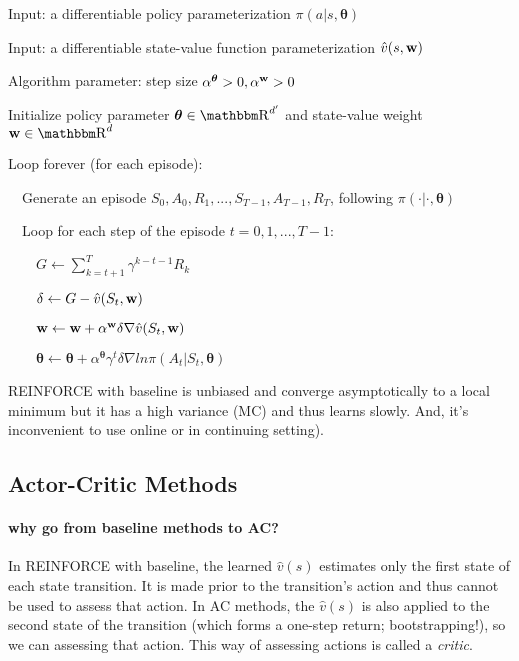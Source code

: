 \documentclass[sutton_barto_notes.tex]{subfiles}
\begin{document}
\begin{tcolorbox}[width=1.1\textwidth,title={REINFORCE with baseline (episodic) for estimating $\pi_*$}]
Input: a differentiable policy parameterization $\pi(a|s,\bm{\theta})$

Input: a differentiable state-value function parameterization $\hat{v}(s,{\operatorname*{\mathbf{w}}})$

Algorithm parameter: step size $\alpha^{\bm{\theta}} > 0, \alpha^{{\operatorname*{\mathbf{w}}}} > 0$

Initialize policy parameter $\bm{\theta} \in \R^{d'}$ and state-value weight ${\bw} \in \R^d$

Loop forever (for each episode):

$\quad$Generate an episode $S_0,A_0,R_1,...,S_{T-1},A_{T-1},R_T$, following $\pi(\cdot|\cdot,\bm{\theta})$

$\quad$Loop for each step of the episode $t=0,1,...,T-1$:

$\quad\quad G\leftarrow\sum_{k=t+1}^T \gamma^{k-t-1}R_k$

$\quad\quad \delta\leftarrow G - \hat{v}(S_t, {\operatorname*{\mathbf{w}}})$

$\quad\quad {\operatorname*{\mathbf{w}}} \leftarrow {\operatorname*{\mathbf{w}}} + \alpha^{{\operatorname*{\mathbf{w}}}}\delta\nabla\hat{v}(S_t,{\operatorname*{\mathbf{w}}})$

$\quad\quad\bm{\theta}\leftarrow\bm{\theta}+\alpha^{\bm{\theta}}\gamma^t \delta \nabla ln\pi(A_t | S_t, \bm{\theta})$
\end{tcolorbox}

REINFORCE with baseline is unbiased and converge asymptotically to a local minimum but it has a high variance (MC) and thus learns slowly.
And, it’s inconvenient to use online or in continuing setting).


\subsection{Actor-Critic Methods}

\paragraph{why go from baseline methods to AC?} In REINFORCE with baseline, the learned $\hat{v}(s)$ estimates only the first state of each state transition. It is made prior to the transition's action and thus cannot be used to assess that action. In AC methods, the $\hat{v}(s)$ is also applied to the second state of the transition (which forms a one-step return; bootstrapping!), so we can assessing that action. This way of assessing actions is called a \textit{critic}.
\end{document}
